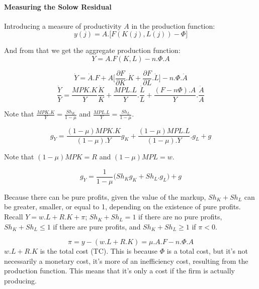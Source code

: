\paragraph{Measuring the Solow Residual} 
Introducing a measure of productivity $A$ in the production function: 
\begin{equation*}
    y(j)=A.\big[F(K(j),L(j))-\Phi \big]
\end{equation*}

And from that we get the aggregate production function: 
\begin{equation*}
    Y=A.F(K,L)-n.\Phi.A
\end{equation*}

\begin{equation*}
    \dot{Y}=\dot{A}.F+A\big[ \frac{\partial F}{\partial K}.\dot{K} + \frac{\partial F}{\partial L}.\dot{L} \big]-n.\Phi.\dot{A} 
\end{equation*}
\begin{equation*}
    \frac{\dot{Y}}{Y}=\frac{MPK.K}{Y}\frac{\dot{K}}{K}+\frac{MPL.L}{Y}.\frac{\dot{L}}{L}+\frac{(F-n\Phi).A}{Y}.\frac{\dot{A}}{A}
\end{equation*}

Note that $\frac{MPK.K}{Y}=\frac{Sh_{K}}{1-\mu}$ and $\frac{MPL.L}{Y}=\frac{Sh_{L}}{1-\mu}$.

\begin{equation*}
    g_{Y}=\frac{(1-\mu)MPK.K}{(1-\mu).Y}g_{K}+\frac{(1-\mu)MPL.L}{(1-\mu).Y}.g_{L}+g
\end{equation*}

Note that $(1-\mu)MPK=R$ and $(1-\mu)MPL=w$.

\begin{equation}\label{Output_growth}
    g_{Y}=\frac{1}{1-\mu}\big(Sh_{K}g_{K}+Sh_{L}.g_{L}\big)+g
\end{equation}

Because there can be pure profits, given the value of the markup, $Sh_{K}+Sh_{L}$ can be greater, smaller, or equal to 1, depending on the existence of pure profits. Recall $Y=w.L+R.K+\pi$; $Sh_{K}+Sh_{L}=1$ if there are no pure profits, $Sh_{K}+Sh_{L}\leq1$ if there are pure profits, and $Sh_{K}+Sh_{L}\geq 1$ if $\pi<0$.

\begin{equation*}
    \pi=y-(w.L+R.K)=\mu.A.F-n.\Phi.A
\end{equation*}
$w.L+R.K$ is the total cost (TC). This is because $\Phi$ is a total cost, but it's not necessarily a monetary cost, it's more of an inefficiency cost, resulting from the production function. This means that it's only a cost if the firm is actually producing. 

